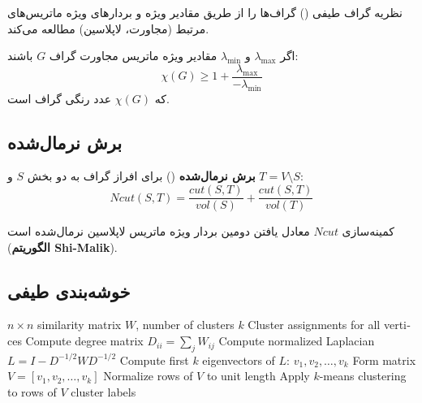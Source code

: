 \documentclass{matinbook}
\begin{document}
    نظریه گراف طیفی
    ()
    گراف‌ها را از طریق مقادیر ویژه
    و بردارهای ویژه ماتریس‌های
    مرتبط (مجاورت، لاپلاسین) مطالعه می‌کند.
    
    \begin{theorem}
        اگر $\lambda_{\max}$ و $\lambda_{\min}$
        مقادیر ویژه ماتریس مجاورت گراف $G$ باشند:
        \[
        \chi(G) \geq 1 + \frac{\lambda_{\max}}{-\lambda_{\min}}
        \]
        که $\chi(G)$ عدد رنگی گراف است.
        \label{thm:spectral-coloring}
    \end{theorem}
    
    \subsection{برش نرمال‌شده}
    
    \begin{definition}
        \textbf{برش نرمال‌شده}
        () برای افراز گراف
        به دو بخش $S$ و $T = V \setminus S$:
        \[
        Ncut(S, T) = \frac{cut(S, T)}{vol(S)} + \frac{cut(S, T)}{vol(T)}
        \]
        \label{def:normalized-cut}
    \end{definition}
    
    کمینه‌سازی $Ncut$ معادل یافتن
    دومین بردار ویژه ماتریس لاپلاسین
    نرمال‌شده است (\textbf{الگوریتم Shi-Malik}).
    
    \subsection{خوشه‌بندی طیفی}
    
    \begin{latin}
        \begin{algorithm}
            \begin{algorithmic}[1]
                \Require $n \times n$ similarity matrix $W$, number of clusters $k$
                \Ensure Cluster assignments for all vertices
                \State Compute degree matrix $D_{ii} = \sum_{j} W_{ij}$
                \State Compute normalized Laplacian
                $L = I - D^{-1/2}WD^{-1/2}$
                \State Compute first $k$ eigenvectors of $L$:
                $v_{1}, v_{2}, \ldots, v_{k}$
                \State Form matrix $V = [v_{1}, v_{2}, \ldots, v_{k}]$
                \State Normalize rows of $V$ to unit length
                \State Apply $k$-means clustering to rows of $V$
                \State \Return cluster labels
            \end{algorithmic}
        \end{algorithm}
    \end{latin}
    
\end{document}
